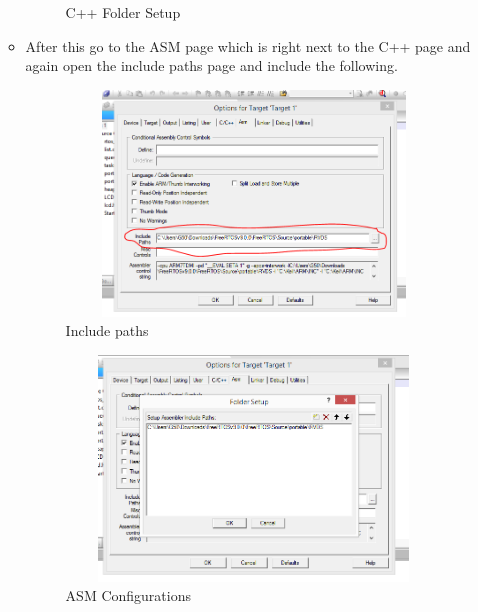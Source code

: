 \documentclass[11pt,a4paper]{book}
\begin{document}
\begin{enumerate}
\begin{itemize}
\begin{figure}[H]
	\caption{C++ Folder Setup}
\end{figure}
\item After this go to the ASM page which is right next to the C++ page and again open the include paths page and include the following.
\begin{figure}[H]
	\centering
	\includegraphics[width=10cm,height=6cm]{asm.PNG}
	\caption{Include paths}
\end{figure}
\begin{figure}[H]
	\centering
	\includegraphics[width=10cm,height=6cm]{asmpath.PNG}
	\caption{ASM Configurations}
\end{figure}


\end{itemize}
\end{enumerate}
\end{document}
